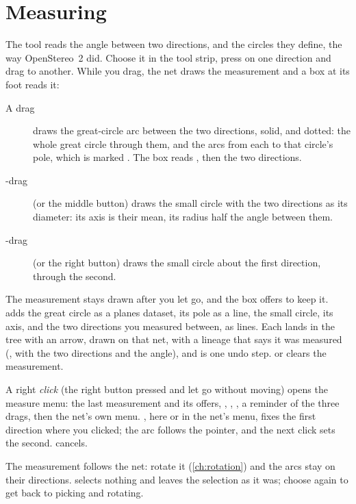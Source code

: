 \section{Measuring}\label{sec:measure}

The  tool reads the angle between two directions, and the circles they define, the way
OpenStereo~2 did. Choose it in the tool strip, press on one direction and drag to another. While you drag,
the net draws the measurement and a box at its foot reads it:

\begin{description}
\item[A drag] draws the great-circle arc between the two directions, solid, and dotted: the whole great
circle through them, and the arcs from each to that circle's pole, which is marked \ui{+}. The box reads
, then the two directions.
\item[-drag] (or the middle button) draws the small circle with the two directions as its
diameter: its axis is their mean, its radius half the angle between them.
\item[-drag] (or the right button) draws the small circle about the first direction, through
the second.
\end{description}

The measurement stays drawn after you let go, and the box offers to keep it.  adds the great
circle as a planes dataset,  its pole as a line,  the small circle,
 its axis, and  the two directions you measured between, as lines. Each lands
in the tree with an arrow, drawn on that net, with a lineage that says it was measured (,
with the two directions and the angle), and is one undo step.  or  clears the measurement.

A right \emph{click} (the right button pressed and let go without moving) opens the measure menu: the
last measurement and its offers, , , ,
a reminder of the three drags, then the net's own menu. , here or in the net's menu,
fixes the first direction where you clicked; the arc follows the pointer, and the next click sets the
second.  cancels.

The measurement follows the net: rotate it (\cref{ch:rotation}) and the arcs stay on their directions.
 selects nothing and leaves the selection as it was; choose  again to get back to
picking and rotating.

